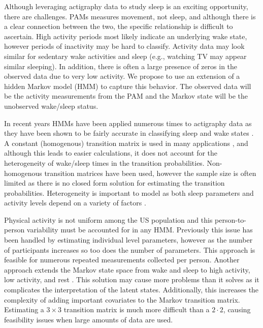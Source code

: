 \documentclass[num-refs]{wiley-article}
\begin{document}
Although leveraging actigraphy data to study sleep is an exciting opportunity, there are challenges. PAMs measures movement, not sleep, and although there is a clear connection between the two, the specific relationship is difficult to ascertain. High activity periods most likely indicate an underlying wake state, however periods of inactivity may be hard to classify. Activity data may look similar for sedentary wake activities and sleep (e.g., watching TV may appear similar sleeping). In addition, there is often a large presence of zeros in the observed data due to very low activity. We propose to use an extension of a hidden Markov model (HMM) to capture this behavior. The observed data will be the activity measurements from the PAM and the Markov state will be the unobserved wake/sleep status.

In recent years HMMs have been applied numerous times to actigraphy data \cite{Liu2020a,Boeker2021} as they have been shown to be fairly accurate in classifying sleep and wake states \cite{Li2020,Witowski2014}. A constant (homogenous) transition matrix is used in many applications \cite{Xu2022,Su2022}, and although this leads to easier calculations, it does not account for the heterogeneity of wake/sleep times in the transition probabilities. Non-homogenous transition matrices have been used, however the sample size is often limited \cite{Ogbagaber2024,Huang2018a} as there is no closed form solution for estimating the transition probabilities. Heterogeneity is important to model as both sleep parameters and activity levels depend on a variety of factors \cite{etindele2022,Salvo2015,mitchell2017}. 

Physical activity is not uniform among the US population \cite{hootman2003} and this person-to-person variability must be accounted for in any HMM. Previously this issue has been handled by estimating individual level parameters, however as the number of participants increases so too does the number of parameters. This approach is feasible for numerous repeated measurements collected per person. Another approach extends the Markov state space from wake and sleep to high activity, low activity, and rest \cite{Huang2018a,Boeker2021}. This solution may cause more problems than it solves as it complicates the interpretation of the latent states. Additionally, this increases the complexity of adding important covariates to the Markov transition matrix. Estimating a $3\times3$ transition matrix is much more difficult than a $2\cdot2$, causing feasibility issues when large amounts of data are used. 
\end{document}
